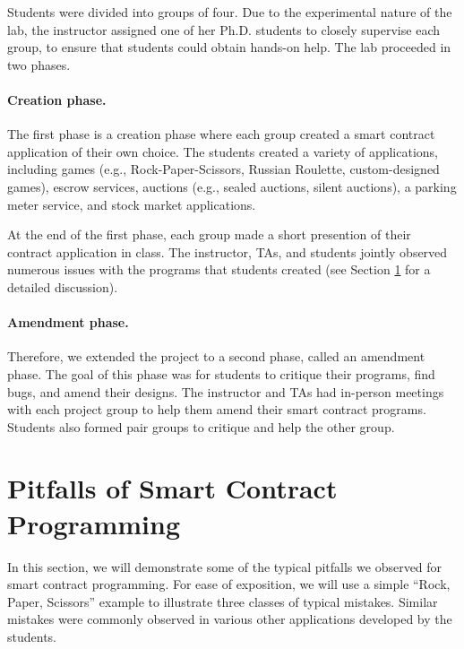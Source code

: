 \documentclass[10pt,twocolumn,letterpaper]{article}
\begin{document}
Students were divided into groups of four.  
Due to the experimental nature of the lab, 
the instructor assigned one of her Ph.D. students 
to closely supervise each group, to ensure that students
could obtain hands-on help.
The lab proceeded in two phases. 

\paragraph{Creation phase.}
The first phase is a 
{creation} phase where each group created a 
smart contract application
of their own choice.
The students created a variety of applications, including
games (e.g., Rock-Paper-Scissors, Russian Roulette, custom-designed games),
escrow services, 
auctions (e.g., sealed auctions, silent auctions),
a parking meter 
service, and stock market applications.

At the end of the first phase, each group 
made a short presention of their 
contract application in class.
The instructor, TAs, and students jointly observed numerous issues  
with the programs that students 
created (see Section \ref{sec:pitfalls} for a detailed
discussion). 

\paragraph{Amendment phase.}
Therefore, we extended the project to a second phase, called 
an {amendment} phase. 
The goal of this phase was for students to critique their programs,
find bugs, and amend their designs. 
The instructor and TAs had in-person meetings with each project group
to help them amend their smart contract programs.  
Students also formed pair groups to critique and 
help the other group. 



\section{Pitfalls of Smart Contract Programming}
\label{sec:pitfalls}
In this section, we will demonstrate some of the typical pitfalls
we observed for smart contract programming. 
For ease of exposition, we will use
a simple ``Rock, Paper, Scissors''  
example to illustrate three classes of typical mistakes.
Similar mistakes 
were commonly observed in various other 
applications developed by the students.  
\end{document}

